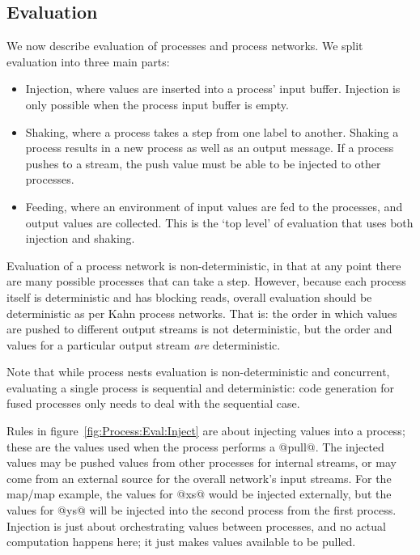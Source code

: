 \subsection{Evaluation}
\label{s:Process:Eval}




We now describe evaluation of processes and process networks.
We split evaluation into three main parts:
\begin{itemize}
\item Injection, where values are inserted into a process' input buffer.
Injection is only possible when the process input buffer is empty.
\item Shaking, where a process takes a step from one label to another.
Shaking a process results in a new process as well as an output message.
If a process pushes to a stream, the push value must be able to be injected to other processes.
\item Feeding, where an environment of input values are fed to the processes, and output values are collected.
This is the `top level' of evaluation that uses both injection and shaking.
\end{itemize}

Evaluation of a process network is non-deterministic, in that at any point there are many possible processes that can take a step.
However, because each process itself is deterministic and has blocking reads, overall evaluation should be deterministic as per Kahn process networks.
That is: the order in which values are pushed to different output streams is not deterministic, but the order and values for a particular output stream \emph{are} deterministic.

Note that while process nests evaluation is non-deterministic and concurrent, evaluating a single process is sequential and deterministic: code generation for fused processes only needs to deal with the sequential case.

Rules in figure~\ref{fig:Process:Eval:Inject} are about injecting values into a process; these are the values used when the process performs a @pull@.
The injected values may be pushed values from other processes for internal streams, or may come from an external source for the overall network's input streams.
For the map/map example, the values for @xs@ would be injected externally, but the values for @ys@ will be injected into the second process from the first process.
Injection is just about orchestrating values between processes, and no actual computation happens here; it just makes values available to be pulled.

